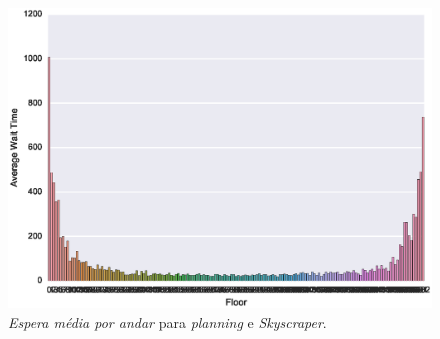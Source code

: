 \begin{figure}[H]
  \centering
  \includegraphics[scale=0.8]{img/results/Skyscraper/5_Planning_Random/averageWaitTime}
  \caption{\textit{Espera média por andar} para \textit{planning} e \textit{Skyscraper}.}
  \label{fig:result:skyscraper:avgwt:planning}
\end{figure}
